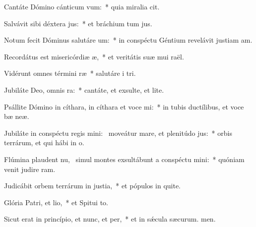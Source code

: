 \item Cantáte Dómino cánticum vum:~* quia miralia cit.
\item Salvávit sibi déxtera jus:~* et bráchium tum jus.
\item Notum fecit Dóminus salutáre um:~* in conspéctu Géntium revelávit justiam am.
\item Recordátus est misericórdiæ æ,~* et veritátis suæ mui raël.
\item Vidérunt omnes términi ræ~* salutáre i tri.
\item Jubiláte Deo, omnis ra:~* cantáte, et exsulte, et lite.
\item Psállite Dómino in cíthara, in cíthara et voce mi:~* in tubis ductílibus, et voce bæ neæ.
\item Jubiláte in conspéctu regis mini:~\pscross{} moveátur mare, et plenitúdo jus:~* orbis terrárum, et qui hábi in o.
\item Flúmina plaudent nu,~\pscross{} simul montes exsultábunt a conspéctu mini:~* quóniam venit judire ram.
\item Judicábit orbem terrárum in justia,~* et pópulos in quite.
\item Glória Patri, et lio,~* et Spitui to.
\item Sicut erat in princípio, et nunc, et per,~* et in sǽcula sæcurum. men.

